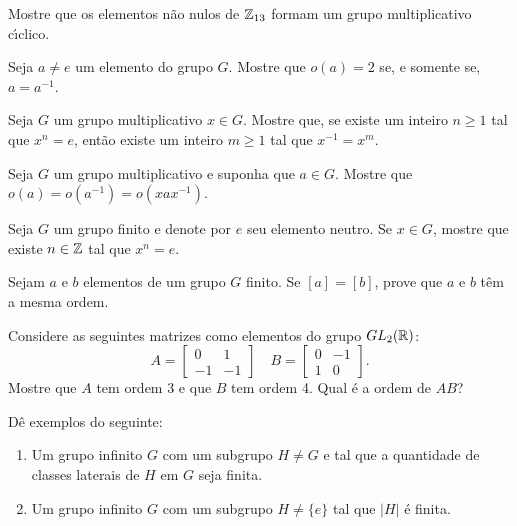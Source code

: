 \documentclass[12pt]{exam}
\begin{document}
    \vspace{.3cm}

    \questao{} Mostre que os elementos n\~ao nulos de $\mathbb{Z}_{13}$ formam um grupo multiplicativo c{\'\i}clico.

    \vspace{.3cm}

    \questao{} Seja $a \ne e$ um elemento do grupo $G$. Mostre que $o(a) = 2$ se, e somente se, $a = a^{-1}$.

    \vspace{.3cm}

    \questao{} Seja $G$ um grupo multiplicativo $x \in G$. Mostre que, se existe um inteiro $n \ge 1$ tal que $x^n = e$, ent\~ao existe um inteiro $m \ge 1$ tal que $x^{-1} = x^m$.

    \vspace{.3cm}

    \questao{} Seja $G$ um grupo multiplicativo e suponha que $a \in G$. Mostre que $o(a) = o(a^{-1}) = o(xax^{-1})$.

    \vspace{.3cm}

    \questao{} Seja $G$ um grupo finito e denote por $e$ seu elemento neutro. Se $x \in G$, mostre que existe $n \in \mathbb{Z}$ tal que $x^n = e$.

    \vspace{.3cm}

    \questao{} Sejam $a$ e $b$ elementos de um grupo $G$ finito. Se $[a] = [b]$, prove que $a$ e $b$ t\^em a mesma ordem.

    \vspace{.3cm}

    \questao{} Considere as seguintes matrizes como elementos do grupo $GL_2(\mathbb{R})$:
    \[
        A = \begin{bmatrix}
            0 & 1\\
            -1 & -1
        \end{bmatrix}\quad
        B = \begin{bmatrix}
            0 & -1\\
            1 & 0
        \end{bmatrix}.
    \]
    Mostre que $A$ tem ordem 3 e que $B$ tem ordem 4. Qual é a ordem de $AB$?

    \vspace{.3cm}

    \questao{} Dê exemplos do seguinte:
    \begin{enumerate}[label={\alph*})]
        \item Um grupo infinito $G$ com um subgrupo $H \ne G$ e tal que a quantidade de classes laterais de $H$ em $G$ seja finita.

        \item Um grupo infinito $G$ com um subgrupo $H \ne \{e\}$ tal que $|H|$ é finita.
    \end{enumerate}
\end{document}
